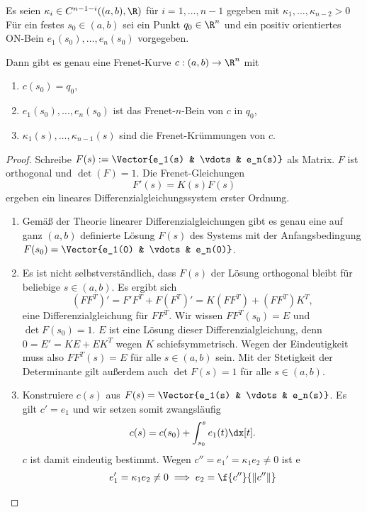 \begin{st}
	Es seien $\kappa_i \in C^{n-1-i}((a,b), \R)$ für $i = 1, \dotsc, n-1$ gegeben mit $\kappa_1, \dotsc, \kappa_{n-2} > 0$
	Für ein festes $s_0 \in (a,b)$ sei ein Punkt $q_0 \in \R^n$ und ein positiv orientiertes ON-Bein $e_1(s_0), \dotsc, e_n(s_0)$ vorgegeben.

	Dann gibt es genau eine Frenet-Kurve $c: (a,b) \to \R^n$ mit
	\begin{enumerate}[1)]
		\item
			$c(s_0) = q_0$,
		\item
			$e_1(s_0), \dotsc, e_n(s_0)$ ist das Frenet-$n$-Bein von $c$ in $q_0$,
		\item
			$\kappa_1(s), \dotsc, \kappa_{n-1}(s)$ sind die Frenet-Krümmungen von $c$.
	\end{enumerate}
	\begin{proof}
		Schreibe $F(s) := \Vector{e_1(s) & \vdots & e_n(s)}$ als Matrix.
		$F$ ist orthogonal und $\det(F) = 1$.
		Die Frenet-Gleichungen
		\[
			F'(s) = K(s) F(s)
		\]
		ergeben ein lineares Differenzialgleichungssystem erster Ordnung.
		\begin{enumerate}[1.]
			\item
				Gemäß der Theorie linearer Differenzialgleichungen gibt es genau eine auf ganz $(a,b)$ definierte Lösung $F(s)$ des Systems mit der Anfangsbedingung $F(s_0) = \Vector{e_1(0) & \vdots & e_n(0)}$.
			\item
				Es ist nicht selbstverständlich, dass $F(s)$ der Lösung orthogonal bleibt für beliebige $s \in (a,b)$.
				Es ergibt sich
				\[
					(FF^T)'
					= F' F^T + F (F^T)'
					= K (F F^T) + (F F^T) K^T,
				\]
				eine Differenzialgleichung für $FF^T$.
				Wir wissen $FF^T(s_0) = E$ und $\det F(s_0) = 1$.
				$E$ ist eine Lösung dieser Differenzialgleichung, denn $0 = E' = KE + EK^T$ wegen $K$ schiefsymmetrisch.
				Wegen der Eindeutigkeit muss also $FF^T(s) = E$ für alle $s \in (a,b)$ sein.
				Mit der Stetigkeit der Determinante gilt außerdem auch $\det F(s) = 1$ für alle $s \in (a,b)$.
			\item
				Konstruiere $c(s)$ aus $F(s) = \Vector{e_1(s) & \vdots & e_n(s)}$.
				Es gilt $c' = e_1$ und wir setzen somit zwangsläufig
				\[
					c(s) = c(s_0) + \int_{s_0}^s e_1(t) \dx[t].
				\]
				$c$ ist damit eindeutig bestimmt.
				Wegen $c'' = e_1' = \kappa_1 e_2 \neq 0$ ist e
				\begin{align*}
					e_1' = \kappa_1 e_2 \neq 0 &\implies e_2 = \f{c''}{\|c''\|} \\

\end{align*}
\end{enumerate}
\end{proof}
\end{st}

